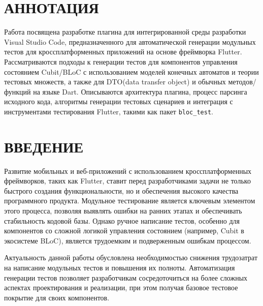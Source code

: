 \documentclass[14pt, russian]{scrartcl}
\newcommand{\anonsection}[1]{\cleardoublepage
\phantomsection
\addcontentsline{toc}{section}{\protect\numberline{}#1}
\section*{#1}\vspace*{2.5ex} %
}
\begin{document}
\section*{АННОТАЦИЯ}

Работа посвящена разработке плагина для интегрированной среды разработки Visual Studio Code, предназначенного для автоматической генерации модульных тестов для кроссплатформенных приложений на основе фреймворка Flutter. Рассматриваются подходы к генерации тестов для компонентов управления состоянием Cubit/BLoC с использованием моделей конечных автоматов и теории тестовых множеств, а также для DTO(data transfer object) и обычных методов/функций на языке Dart. Описываются архитектура плагина, процесс парсинга исходного кода, алгоритмы генерации тестовых сценариев и интеграция с инструментами тестирования Flutter, такими как пакет \texttt{bloc\_test}.


\newpage
\renewcommand\contentsname{\hfill{\normalfont{СОДЕРЖАНИЕ}}\hfill}
\tableofcontents
\newpage
\anonsection{ВВЕДЕНИЕ}

Развитие мобильных и веб-приложений с использованием кроссплатформенных фреймворков, таких как Flutter, ставит перед разработчиками задачи не только быстрого создания функциональности, но и обеспечения высокого качества программного продукта. Модульное тестирование является ключевым элементом этого процесса, позволяя выявлять ошибки на ранних этапах и обеспечивать стабильность кодовой базы. Однако ручное написание тестов, особенно для компонентов со сложной логикой управления состоянием (например, Cubit в экосистеме BLoC), является трудоемким и подверженным ошибкам процессом.

Актуальность данной работы обусловлена необходимостью снижения трудозатрат на написание модульных тестов и повышения их полноты. Автоматизация генерации тестов позволяет разработчикам сосредоточиться на более сложных аспектах проектирования и реализации, при этом получая базовое тестовое покрытие для своих компонентов.
\end{document}
